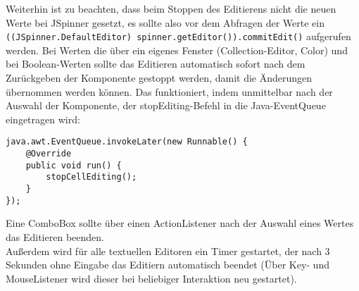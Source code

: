 Weiterhin ist zu beachten, dass beim Stoppen des Editierens nicht die neuen Werte bei JSpinner gesetzt, es sollte also vor dem Abfragen der Werte ein \lstinline{((JSpinner.DefaultEditor) spinner.getEditor()).commitEdit()} aufgerufen werden. Bei Werten die über ein eigenes Fenster (Collection-Editor, Color) und bei Boolean-Werten sollte das Editieren automatisch sofort nach dem Zurückgeben der Komponente gestoppt werden, damit die Änderungen übernommen werden können. Das funktioniert, indem unmittelbar nach der Auswahl der Komponente, der stopEditing-Befehl in die Java-EventQueue eingetragen wird:
\begin{lstlisting}
java.awt.EventQueue.invokeLater(new Runnable() {
	@Override
	public void run() {
		stopCellEditing();
	}
});
\end{lstlisting}
Eine ComboBox sollte über einen ActionListener nach der Auswahl eines Wertes das Editieren beenden.\\
Außerdem wird für alle textuellen Editoren ein Timer gestartet, der nach 3 Sekunden ohne Eingabe das Editiern automatisch beendet (Über Key- und MouseListener wird dieser bei beliebiger Interaktion neu gestartet).

